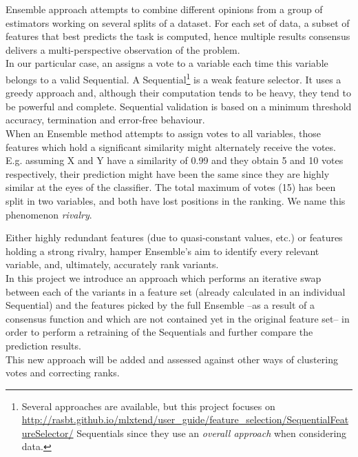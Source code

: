 Ensemble approach attempts to combine different opinions from a group of estimators working on several splits of a dataset. For each set of data, a subset of features that best predicts the task is computed, hence multiple results consensus delivers a multi-perspective observation of the problem. 
\\

In our particular case, an  assigns a vote to a variable each time this variable belongs to a valid Sequential. A Sequential\footnote{Several approaches are available, but this project focuses on \href{forward/backward}{http://rasbt.github.io/mlxtend/user_guide/feature_selection/SequentialFeatureSelector/} Sequentials since they use an \emph{overall approach} when considering data.} is a weak feature selector. It uses a greedy approach and, although their computation tends to be heavy, they tend to be powerful and complete. Sequential validation is based on a minimum threshold accuracy, termination and error-free behaviour.
\\

When an Ensemble method attempts to assign votes to all variables, those features which hold a significant similarity might alternately receive the votes. E.g. assuming X and Y have a similarity of 0.99 and they obtain 5 and 10 votes respectively, their prediction might have been the same since they are highly similar at the eyes of the classifier. The total maximum of votes (15) has been split in two variables, and both have lost positions in the ranking. We name this phenomenon \emph{rivalry}.

Either highly redundant features (due to quasi-constant values, etc.) or features holding a strong rivalry, hamper Ensemble's aim to identify every relevant variable, and, ultimately, accurately rank variants.
\\

In this project we introduce an approach which performs an iterative swap between each of the variants in a feature set (already calculated in an individual Sequential) and the features picked by the full Ensemble --as a result of a consensus function and which are not contained yet in the original feature set-- in order to perform a retraining of the Sequentials and further compare the prediction results.
\\

This new approach will be added and assessed against other ways of clustering votes and correcting ranks.
\\


